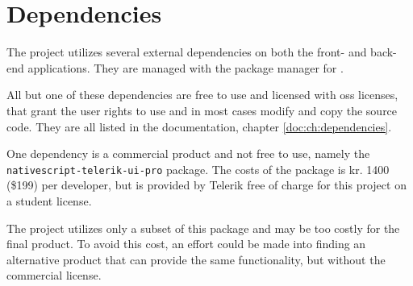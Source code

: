 \section{Dependencies}
\label{sec:dependencies}
The project utilizes several external dependencies on both the front- and back-end applications.
They are managed with the package manager  for .

All but one of these dependencies are free to use and licensed with \gls{oss} licenses, that grant the user rights to use and in most cases modify and copy the source code.
They are all listed in the documentation, chapter \ref{doc:ch:dependencies}.

One dependency is a commercial product and not free to use, namely the \verb+nativescript-telerik-ui-pro+ package.
The costs of the package is kr. 1400 (\$199) \citep{dependencies:nativescript} per developer, but is provided by Telerik free of charge for this project on a student license.

The project utilizes only a subset of this package and may be too costly for the final product.
To avoid this cost, an effort could be made into finding an alternative product that can provide the same functionality, but without the commercial license.
